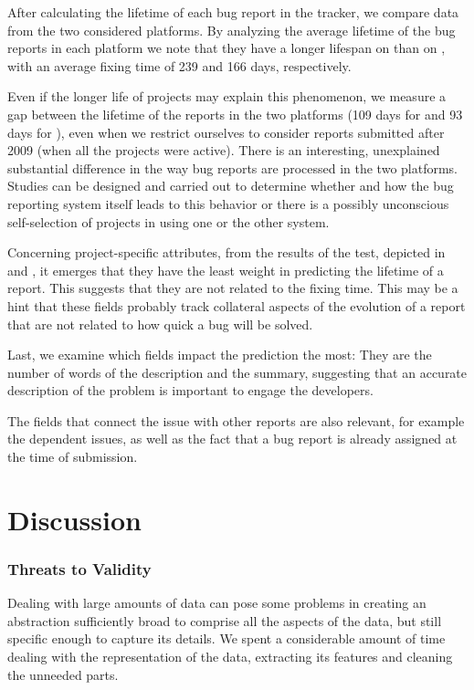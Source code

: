After calculating the lifetime of each bug report in the tracker, we compare data from the two considered platforms.
By analyzing the average lifetime of the bug reports in each platform we note that they have a longer lifespan on \bzilla than on \jira, with an average fixing time of 239 and 166 days, respectively.

Even if the longer life of \bzilla projects may explain this phenomenon, we measure a gap between the lifetime of the reports in the two platforms (109 days for \bzilla and 93 days for \jira), even when we restrict ourselves to consider reports submitted after 2009 (\ie when all the projects were active).
There is an interesting, unexplained substantial difference in the way bug reports are processed in the two platforms.
Studies can be designed and carried out to determine whether and how the bug reporting system itself leads to this behavior or there is a possibly unconscious self-selection of projects in using one or the other system.

Concerning project-specific attributes, from the results of the test, depicted in  and , it emerges that they have the least weight in predicting the lifetime of a report.
This suggests that they are not related to the fixing time.
This may be a hint that these fields probably track collateral aspects of the evolution of a report that are not related to how quick a bug will be solved.

Last, we examine which fields impact the prediction the most: They are the number of words of the description and the summary, suggesting that an accurate description of the problem is important to engage the developers.

The fields that connect the issue with other reports are also relevant, for example the dependent issues, as well as the fact that a bug report is already assigned at the time of submission.



\section{Discussion} \label{sec:model-discussion}

\subsubsection{Threats to Validity}

Dealing with large amounts of data can pose some problems in creating an abstraction sufficiently broad to comprise all the aspects of the data, but still specific enough to capture its details.
We spent a considerable amount of time dealing with the representation of the data, extracting its features and cleaning the unneeded parts.

